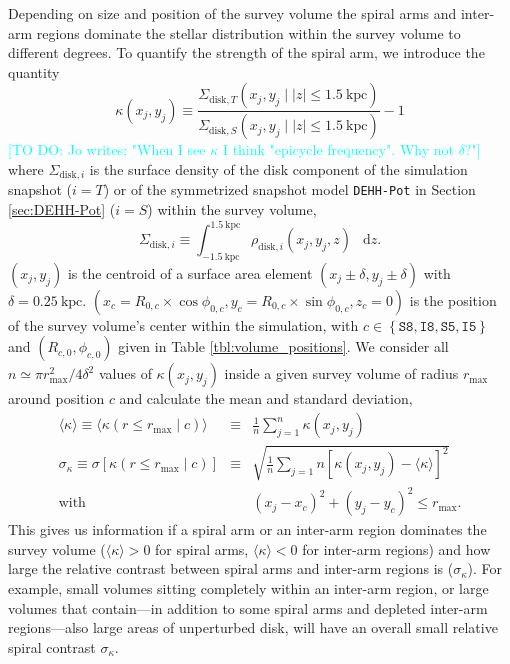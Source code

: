 \documentclass[iop,revtex4,numberedappendix,appendixfloats]{emulateapj}
\newcommand*\diff{\mathop{}\!\mathrm{d}}
\newcommand{\Jo}[1]{\textcolor{Cyan}{#1}}
\begin{document}
Depending on size and position of the survey volume the spiral arms and inter-arm regions dominate the stellar distribution within the survey volume to different degrees. To quantify the strength of the spiral arm, we introduce the quantity
\begin{equation}
\kappa(x_j,y_j) \equiv \frac{\Sigma_{\text{disk},T}(x_j,y_j \mid |z|\leq 1.5~\text{kpc})}{\Sigma_{\text{disk},S}(x_j,y_j \mid |z| \leq1.5~\text{kpc})} -1\label{eq:kappa_definition}
\end{equation}
\Jo{[TO DO: Jo writes: "When I see $\kappa$ I think "epicycle frequency". Why not $\delta$?"]}
where $\Sigma_{\text{disk},i}$ is the surface density of the disk component  of the simulation snapshot ($i=T$) or of the symmetrized snapshot model \texttt{DEHH-Pot} in Section \ref{sec:DEHH-Pot} ($i=S$) within the survey volume,
\begin{equation}
\Sigma_{\text{disk},i} \equiv \int_{-1.5~\text{kpc}}^{1.5~\text{kpc}} \rho_{\text{disk},i}(x_j,y_j,z) \ \diff z.
\end{equation}
$(x_j,y_j)$ is the centroid of a surface area element $(x_j\pm\delta,y_j\pm \delta)$ with $\delta=0.25~\text{kpc}$. $(x_c=R_{0,c}\times\cos \phi_{0,c},y_c=R_{0,c}\times\sin \phi_{0,c},z_c=0)$ is the position of the survey volume's center within the simulation, with $c\in\left\{ \texttt{S8},\texttt{I8},\texttt{S5},\texttt{I5}\right\}$ and $(R_{c,0},\phi_{c,0})$ given in Table \ref{tbl:volume_positions}. We consider all $n \simeq \pi r_\text{max}^2/4\delta^2$ values of $\kappa(x_j,y_j)$ inside a given survey volume of radius $r_\text{max}$ around position $c$ and calculate the mean and standard deviation,
\begin{eqnarray}
\langle \kappa \rangle \equiv \langle \kappa (r \leq r_\text{max} \mid c) \rangle &\equiv & \frac 1n \sum_{j=1}^n \kappa(x_j,y_j)\label{eq:mean_kappa}\\
\sigma_\kappa \equiv \sigma[\kappa(r \leq r_\text{max} \mid c)]  &\equiv &  \sqrt{\frac 1n \sum_{j=1}{n} \left[ \kappa(x_j,y_j) -  \langle \kappa \rangle \right]^2}\label{eq:std_kappa}\\
 \text{with } && (x_j-x_c)^2 + (y_j-y_c)^2 \leq r_\text{max}. \nonumber
\end{eqnarray}
This gives us information if a spiral arm or an inter-arm region dominates the survey volume ($\langle \kappa \rangle > 0$ for spiral arms, $\langle \kappa \rangle < 0$ for inter-arm regions) and how large the relative contrast between spiral arms and inter-arm regions is ($\sigma_\kappa$). For example, small volumes sitting completely within an inter-arm region, or large volumes that contain---in addition to some spiral arms and depleted inter-arm regions---also large areas of unperturbed disk, will have an overall small relative spiral contrast $\sigma_\kappa$.
\end{document}
